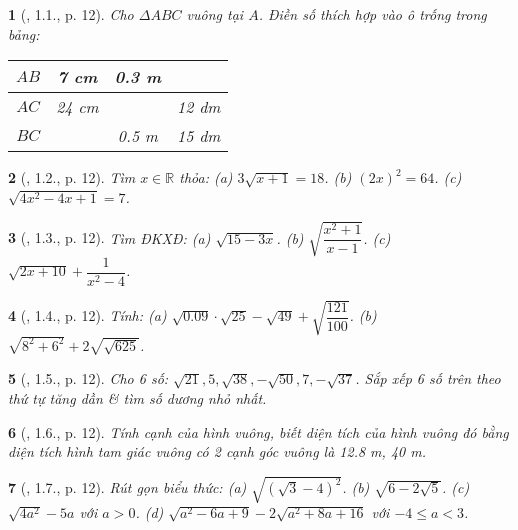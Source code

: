 \documentclass{article}
\newtheorem{baitoan}{}
\begin{document}
\begin{baitoan}[\cite{Binh_boi_duong_Toan_9_tap_1}, 1.1., p. 12]
	Cho $\Delta ABC$ vuông tại $A$. Điền số thích hợp vào ô trống trong bảng:
	\begin{table}[H]
		\centering
		\begin{tabular}{|c|c|c|c|}
			\hline
			$AB$ & 7 cm & 0.3 m &  \\
			\hline
			$AC$ & 24 cm &  & 12 dm \\
			\hline
			$BC$ &  & 0.5 m & 15 dm \\
			\hline
		\end{tabular}
	\end{table}
\end{baitoan}

\begin{baitoan}[\cite{Binh_boi_duong_Toan_9_tap_1}, 1.2., p. 12]
	Tìm $x\in\mathbb{R}$ thỏa: (a) $3\sqrt{x + 1} = 18$. (b) $(2x)^2 = 64$. (c) $\sqrt{4x^2 - 4x + 1} = 7$.
\end{baitoan}

\begin{baitoan}[\cite{Binh_boi_duong_Toan_9_tap_1}, 1.3., p. 12]
	Tìm {\rm ĐKXĐ}: (a) $\sqrt{15 - 3x}$. (b) $\sqrt{\dfrac{x^2 + 1}{x - 1}}$. (c) $\sqrt{2x + 10} + \dfrac{1}{x^2 - 4}$.
\end{baitoan}

\begin{baitoan}[\cite{Binh_boi_duong_Toan_9_tap_1}, 1.4., p. 12]
	Tính: (a) $\sqrt{0.09}\cdot\sqrt{25} - \sqrt{49} + \sqrt{\dfrac{121}{100}}$. (b) $\sqrt{8^2 + 6^2} + 2\sqrt{\sqrt{625}}$.
\end{baitoan}

\begin{baitoan}[\cite{Binh_boi_duong_Toan_9_tap_1}, 1.5., p. 12]
	Cho 6 số: $\sqrt{21},5,\sqrt{38},-\sqrt{50},7,-\sqrt{37}$. Sắp xếp 6 số trên theo thứ tự tăng dần \& tìm số dương nhỏ nhất.
\end{baitoan}

\begin{baitoan}[\cite{Binh_boi_duong_Toan_9_tap_1}, 1.6., p. 12]
	Tính cạnh của hình vuông, biết diện tích của hình vuông đó bằng diện tích hình tam giác vuông có 2 cạnh góc vuông là {\rm12.8 m, 40 m}.
\end{baitoan}

\begin{baitoan}[\cite{Binh_boi_duong_Toan_9_tap_1}, 1.7., p. 12]
	Rút gọn biểu thức: (a) $\sqrt{(\sqrt{3} - 4)^2}$. (b) $\sqrt{6 - 2\sqrt{5}}$. (c) $\sqrt{4a^2} - 5a$ với $a > 0$. (d) $\sqrt{a^2 - 6a + 9} - 2\sqrt{a^2 + 8a + 16}$ với $-4\le a < 3$.
\end{baitoan}
\end{document}
